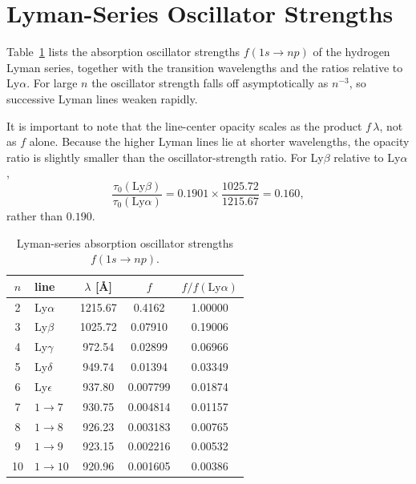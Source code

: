 \documentclass[english,a4paper]{my_memo}
\begin{document}
\section{Lyman-Series Oscillator Strengths}

Table~\ref{tab:fosc} lists the absorption oscillator strengths
$f(1s \to np)$ of the hydrogen Lyman series, together with the transition
wavelengths and the ratios relative to Ly$\alpha$.  For large $n$ the
oscillator strength falls off asymptotically as $n^{-3}$, so successive
Lyman lines weaken rapidly.

It is important to note that the line-center opacity scales as the product
$f\,\lambda$, not as $f$ alone.  Because the higher Lyman lines lie at
shorter wavelengths, the opacity ratio is slightly smaller than the
oscillator-strength ratio.  For Ly$\beta$ relative to Ly$\alpha$,
\begin{equation}
   \frac{\tau_0(\mathrm{Ly}\beta)}{\tau_0(\mathrm{Ly}\alpha)}
   = 0.1901 \times \frac{1025.72}{1215.67}
   = 0.160 ,
\end{equation}
rather than $0.190$.

\begin{table}[htb]
\centering
\caption{Lyman-series absorption oscillator strengths $f(1s \to np)$.}
\label{tab:fosc}
\small
\begin{tabular}{c l c c c}
\toprule
$n$ & line & $\lambda$ [\AA] & $f$ & $f/f(\mathrm{Ly}\alpha)$ \\
\midrule
2  & Ly$\alpha$      & 1215.67 & 0.4162   & 1.00000  \\
3  & Ly$\beta$       & 1025.72 & 0.07910  & 0.19006  \\
4  & Ly$\gamma$      & 972.54  & 0.02899  & 0.06966  \\
5  & Ly$\delta$      & 949.74  & 0.01394  & 0.03349  \\
6  & Ly$\epsilon$    & 937.80  & 0.007799 & 0.01874  \\
7  & $1 \to 7$       & 930.75  & 0.004814 & 0.01157  \\
8  & $1 \to 8$       & 926.23  & 0.003183 & 0.00765  \\
9  & $1 \to 9$       & 923.15  & 0.002216 & 0.00532  \\
10 & $1 \to 10$      & 920.96  & 0.001605 & 0.00386  \\
\bottomrule
\end{tabular}
\end{table}
\end{document}
